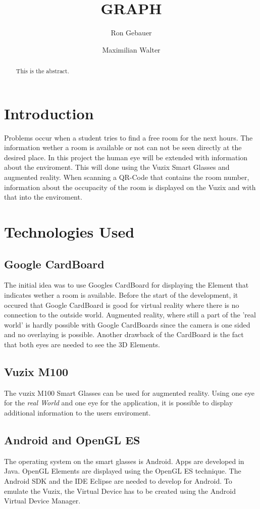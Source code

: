 \documentclass[]{article}
\title{GRAPH}
\author{Ron Gebauer \and Maximilian Walter}
\begin{document}
\maketitle

\begin{abstract}
This is the abstract.
\end{abstract}

\section{Introduction}
Problems occur when a student tries to find a free room for the next hours. The information wether a room is available or not can not be seen directly at the desired place. In this project the human eye will be extended with information about the enviroment. This will done using the Vuzix Smart Glasses and augmented reality. When scanning a QR-Code that contains the room number, information about the occupacity of the room is displayed on the Vuzix and with that into the enviroment. 
\section{Technologies Used}
\subsection{Google CardBoard}
The initial idea was to use Googles CardBoard for displaying the Element that indicates wether a room is available. Before the start of the development, it occured that Google CardBoard is good for virtual reality where there is no connection to the outside world. Augmented reality, where still a part of the 'real world' is hardly possible with Google CardBoards since the camera is one sided and no overlaying is possible.
\newline
Another drawback of the CardBoard is the fact that both eyes are needed to see the 3D Elements.   
\subsection{Vuzix M100}
The vuzix M100 Smart Glasses can be used for augmented reality. Using one eye for the \emph{real World} and one eye for the application, it is possible to display additional information to the users enviroment.
\subsection{Android and OpenGL ES}
The operating system on the smart glasses is Android. Apps are developed in Java. OpenGL Elements are displayed using the OpenGL ES technique. 
\newline
The Android SDK and the IDE Eclipse are needed to develop for Android. To emulate the Vuzix, the Virtual Device has to be created using the Android Virtual Device Manager. 
\end{document}
